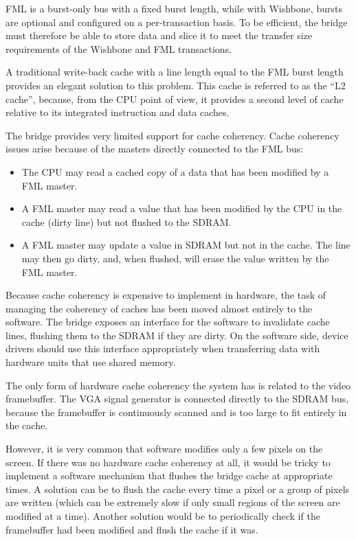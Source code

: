 \documentclass[a4paper,11pt]{kthesis}
\begin{document}
FML is a burst-only bus with a fixed burst length, while with Wishbone, bursts are optional and configured on a per-transaction basis. To be efficient, the bridge must therefore be able to store data and slice it to meet the transfer size requirements of the Wishbone and FML transactions.

A traditional write-back cache with a line length equal to the FML burst length provides an elegant solution to this problem. This cache is referred to as the ``L2 cache'', because, from the CPU point of view, it provides a second level of cache relative to its integrated instruction and data caches.

The bridge provides very limited support for cache coherency. Cache coherency issues arise because of the masters directly connected to the FML bus:
\begin{itemize}
\item The CPU may read a cached copy of a data that has been modified by a FML master.
\item A FML master may read a value that has been modified by the CPU in the cache (dirty line) but not flushed to the SDRAM.
\item A FML master may update a value in SDRAM but not in the cache. The line may then go dirty, and, when flushed, will erase the value written by the FML master.
\end{itemize}

Because cache coherency is expensive to implement in hardware, the task of managing the coherency of caches has been moved almost entirely to the software. The bridge exposes an interface for the software to invalidate cache lines, flushing them to the SDRAM if they are dirty. On the software side, device drivers should use this interface appropriately when transferring data with hardware units that use shared memory.

The only form of hardware cache coherency the system has is related to the video framebuffer. The VGA signal generator is connected directly to the SDRAM bus, because the framebuffer is continuously scanned and is too large to fit entirely in the cache.

However, it is very common that software modifies only a few pixels on the screen. If there was no hardware cache coherency at all, it would be tricky to implement a software mechanism that flushes the bridge cache at appropriate times. A solution can be to flush the cache every time a pixel or a group of pixels are written (which can be extremely slow if only small regions of the screen are modified at a time). Another solution would be to periodically check if the framebuffer had been modified and flush the cache if it was.
\end{document}

